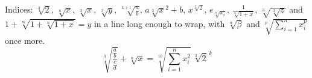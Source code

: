 \documentclass[12pt]{article}
\begin{document}
Indices: $\sqrt[3]{2}$, $\sqrt[n]{x}$, $\sqrt[3]x$, $\sqrt[{3}]{y}$, $\sqrt[k+1]{\frac{a}{b}}$, $a\sqrt[3]{x}^2+b$,
$x^{\sqrt[3]{2}}$, $e_{\sqrt[n]{x_i}}$, $\frac{1}{\sqrt[4]{1+x}}$, $\sqrt[3]{\sqrt[3]{z}}$ and $1+\sqrt[m]{1+\sqrt[n]{1+x}}=y$
in a line long enough to wrap, with $\sqrt[\alpha]{\beta}$ and $\sqrt[p]{\sum_{i=1}^n x_i^p}$ once more.
\[ \sqrt[3]{\frac{\frac{a}{b}}{\frac{c}{d}}} + \sqrt[n]{x} = \sqrt[10]{\sum_{i=1}^n x_i^2}\,\sqrt[3]{2}^{\,k} \]
\end{document}
